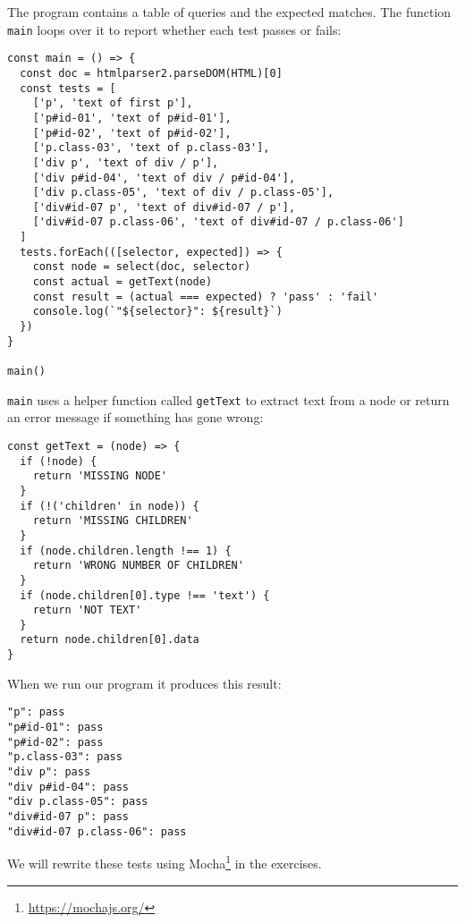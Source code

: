\documentclass[krantzl]{krantz}
\newcommand{\hreffoot}[2]{{#1}\footnote{\href{#2}{#2}}}
\begin{document}
The program contains a table of queries and the expected matches.
The function \texttt{main} loops over it to report whether each test passes or fails:


\begin{lstlisting}[frame=tblr]
const main = () => {
  const doc = htmlparser2.parseDOM(HTML)[0]
  const tests = [
    ['p', 'text of first p'],
    ['p#id-01', 'text of p#id-01'],
    ['p#id-02', 'text of p#id-02'],
    ['p.class-03', 'text of p.class-03'],
    ['div p', 'text of div / p'],
    ['div p#id-04', 'text of div / p#id-04'],
    ['div p.class-05', 'text of div / p.class-05'],
    ['div#id-07 p', 'text of div#id-07 / p'],
    ['div#id-07 p.class-06', 'text of div#id-07 / p.class-06']
  ]
  tests.forEach(([selector, expected]) => {
    const node = select(doc, selector)
    const actual = getText(node)
    const result = (actual === expected) ? 'pass' : 'fail'
    console.log(`"${selector}": ${result}`)
  })
}

main()
\end{lstlisting}



\noindent \texttt{main} uses a helper function called \texttt{getText} to extract text from a node
or return an error message if something has gone wrong:


\begin{lstlisting}[frame=tblr]
const getText = (node) => {
  if (!node) {
    return 'MISSING NODE'
  }
  if (!('children' in node)) {
    return 'MISSING CHILDREN'
  }
  if (node.children.length !== 1) {
    return 'WRONG NUMBER OF CHILDREN'
  }
  if (node.children[0].type !== 'text') {
    return 'NOT TEXT'
  }
  return node.children[0].data
}
\end{lstlisting}



When we run our program it produces this result:


\begin{lstlisting}[frame=tblr,backgroundcolor=\color{black!5}]
"p": pass
"p#id-01": pass
"p#id-02": pass
"p.class-03": pass
"div p": pass
"div p#id-04": pass
"div p.class-05": pass
"div#id-07 p": pass
"div#id-07 p.class-06": pass
\end{lstlisting}



We will rewrite these tests using \hreffoot{Mocha}{https://mochajs.org/} in the exercises.
\end{document}
